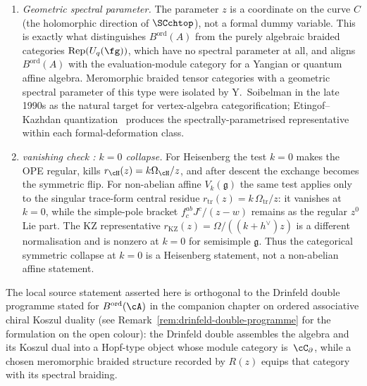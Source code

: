 \begin{remark}
\begin{enumerate}[label=\textup{(\roman*)}]
\item \emph{Geometric spectral parameter.} The parameter $z$ is a coordinate on the curve $C$ (the holomorphic direction of $\SCchtop$), not a formal dummy variable. This is exactly what distinguishes $B^{\mathrm{ord}}(A)$ from the purely algebraic braided categories $\mathrm{Rep}(U_q(\fg))$, which have no spectral parameter at all, and aligns $B^{\mathrm{ord}}(A)$ with the evaluation-module category for a Yangian or quantum affine algebra. Meromorphic braided tensor categories with a geometric spectral parameter of this type were isolated by Y.~Soibelman in the late 1990s as the natural target for vertex-algebra categorification; Etingof--Kazhdan quantization~\cite{etingof1996quantization} produces the spectrally-parametrised representative within each formal-deformation class.
\item \emph{vanishing check : $k = 0$ collapse.} For Heisenberg the
test \(k=0\) makes the OPE regular, kills
\(r_{\cH}(z)=k\Omega_{\cH}/z\), and after descent the exchange becomes
the symmetric flip. For non-abelian affine \(V_k(\mathfrak g)\) the
same test applies only to the singular trace-form central residue
\(r_{\mathrm{tr}}(z)=k\,\Omega_{\mathrm{tr}}/z\): it vanishes at \(k=0\), while the
simple-pole bracket \(f^{ab}_{c}J^c/(z-w)\) remains as the regular
\(z^0\) Lie part. The KZ representative
\(r_{\mathrm{KZ}}(z)=\Omega/((k+h^\vee)z)\) is a different
normalisation and is nonzero at \(k=0\) for semisimple
\(\mathfrak g\). Thus the categorical symmetric collapse at \(k=0\)
is a Heisenberg statement, not a non-abelian affine statement.
\end{enumerate}
The local source statement asserted here is orthogonal to the Drinfeld
double programme stated for $B^{\mathrm{ord}}(\cA)$ in the companion
chapter on ordered associative chiral Koszul duality (see
Remark~\ref{rem:drinfeld-double-programme} for the formulation on the
open colour): the Drinfeld double assembles the algebra and its Koszul
dual into a Hopf-type object whose module category is~$\cC_\partial$,
while a chosen meromorphic braided structure recorded by $R(z)$ equips
that category with its spectral braiding.
\end{remark}


